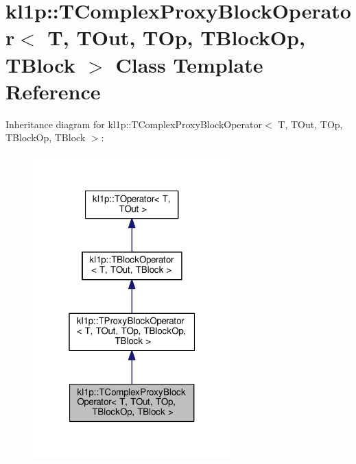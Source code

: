 \hypertarget{classkl1p_1_1TComplexProxyBlockOperator}{}\section{kl1p\+:\+:T\+Complex\+Proxy\+Block\+Operator$<$ T, T\+Out, T\+Op, T\+Block\+Op, T\+Block $>$ Class Template Reference}
\label{classkl1p_1_1TComplexProxyBlockOperator}


Inheritance diagram for kl1p\+:\+:T\+Complex\+Proxy\+Block\+Operator$<$ T, T\+Out, T\+Op, T\+Block\+Op, T\+Block $>$\+:
\nopagebreak
\begin{figure}[H]
\begin{center}
\leavevmode
\includegraphics[width=217pt]{classkl1p_1_1TComplexProxyBlockOperator__inherit__graph}
\end{center}
\end{figure}


